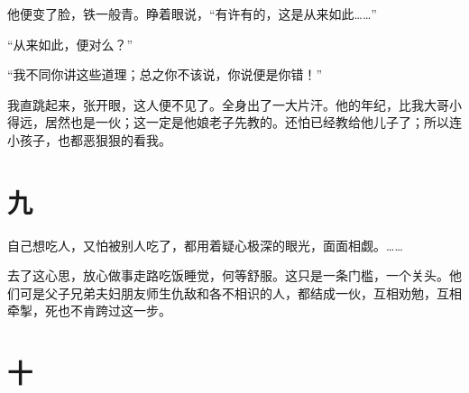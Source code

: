\documentclass[12pt,UTF8]{ctexbook}
\begin{document}
他便变了脸，铁一般青。睁着眼说，“有许有的，这是从来如此……”

“从来如此，便对么？”

“我不同你讲这些道理；总之你不该说，你说便是你错！”

我直跳起来，张开眼，这人便不见了。全身出了一大片汗。他的年纪，比我大哥小得远，居然也是一伙；这一定是他娘老子先教的。还怕已经教给他儿子了；所以连小孩子，也都恶狠狠的看我。

\section{九}

自己想吃人，又怕被别人吃了，都用着疑心极深的眼光，面面相觑。……

去了这心思，放心做事走路吃饭睡觉，何等舒服。这只是一条门槛，一个关头。他们可是父子兄弟夫妇朋友师生仇敌和各不相识的人，都结成一伙，互相劝勉，互相牵掣，死也不肯跨过这一步。

\section{十}
\end{document}
